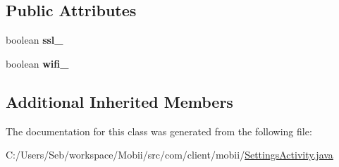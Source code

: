 \subsection*{Public Attributes}
\begin{DoxyCompactItemize}
\item 
\hypertarget{classcom_1_1client_1_1mobii_1_1_settings_activity_ab76cf913c3a183799cf712aad0d88bf7}{boolean {\bfseries ssl\-\_\-}}\label{classcom_1_1client_1_1mobii_1_1_settings_activity_ab76cf913c3a183799cf712aad0d88bf7}

\item 
\hypertarget{classcom_1_1client_1_1mobii_1_1_settings_activity_a1be5fccbd538e32eea8a752468fa5dff}{boolean {\bfseries wifi\-\_\-}}\label{classcom_1_1client_1_1mobii_1_1_settings_activity_a1be5fccbd538e32eea8a752468fa5dff}

\end{DoxyCompactItemize}
\subsection*{Additional Inherited Members}


The documentation for this class was generated from the following file\-:\begin{DoxyCompactItemize}
\item 
C\-:/\-Users/\-Seb/workspace/\-Mobii/src/com/client/mobii/\hyperlink{_settings_activity_8java}{Settings\-Activity.\-java}\end{DoxyCompactItemize}
